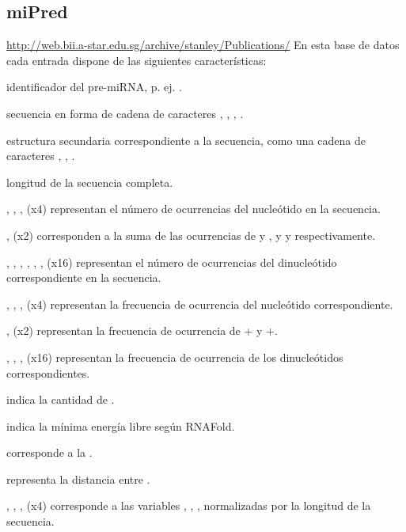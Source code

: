\documentclass[12pt,bibliography=openstyle,DIV=12,parskip=half-]{scrartcl}
\begin{document}
\subsection{miPred \cite{ng}}
\url{http://web.bii.a-star.edu.sg/archive/stanley/Publications/}
%
En esta base de datos cada entrada dispone de las siguientes características:
\begin{description*}
%
\item[identificador] del pre-miRNA, p. ej. .
%
\item[secuencia] en forma de cadena de caracteres , ,
  , .
%
\item[estructura secundaria] correspondiente a la secuencia, como una
  cadena de caracteres \mono{(}, , \mono{)}.
%
\item[longitud] de la secuencia completa.
%
\item[\mono{A}, \mono{G}, \mono{C}, \mono{U}] (x4) representan el
  número de ocurrencias del nucleótido en la secuencia.
%
\item[\mono{G+C}, \mono{A+U}] (x2) corresponden a la suma de las
  ocurrencias de  y , y  y 
  respectivamente.
%
\item[\mono{AA}, \mono{AG}, \mono{AC}, \mono{AU}, \mono{GA},
  \textellipsis, \mono{UU}] (x16) representan el número de ocurrencias
  del dinucleótido correspondiente en la secuencia.
%
\item[\mono{\%A}, \mono{\%G}, \mono{\%C}, \mono{\%U}] (x4) representan
  la frecuencia de ocurrencia del nucleótido correspondiente.
%
\item[\mono{\%(G+C)}, \mono{\%(A+U)}] (x2) representan la frecuencia
  de ocurrencia de + y +.
%
\item[\mono{\%AA}, \mono{\%AG}, \mono{\%AC}, \textellipsis] (x16)
  representan la frecuencia de ocurrencia de los dinucleótidos
  correspondientes.
%
\item[\mono{pb}] indica la cantidad de .
%
\item[\mono{mfe}] indica la mínima energía libre según RNAFold.
%
\item[\mono{Q}] corresponde a la .
%
\item[\mono{D}] representa la distancia entre .
%
\item[\mono{Npb=dP}, \mono{Nmfe=dG}, \mono{NQ=dQ}, \mono{ND=dD}] (x4) corresponde
  a las variables , , , 
  normalizadas por la longitud de la secuencia.
%
\end{description*}
%
%
\end{document}
